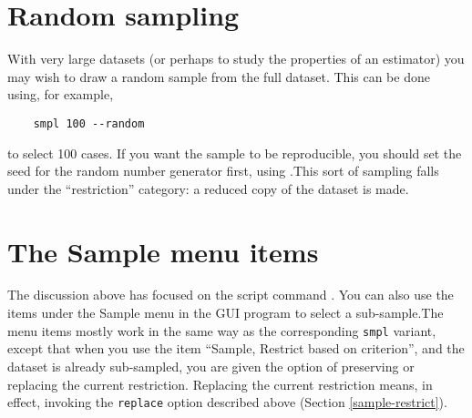 \section{Random sampling}
\label{sample-random}

With very large datasets (or perhaps to study the properties of an
estimator) you may wish to draw a random sample from the full dataset.
This can be done using, for example,
%
\begin{verbatim}
	smpl 100 --random
\end{verbatim}
%
to select 100 cases.  If you want the sample to be reproducible, you
should set the seed for the random number generator first, using
.This sort of sampling falls under the ``restriction''
category: a reduced copy of the dataset is made.

\section{The Sample menu items}
\label{sample-menu}

The discussion above has focused on the script command . You
can also use the items under the \textsf{Sample} menu in the GUI
program to select a sub-sample.The menu items mostly work in the same
way as the corresponding \verb+smpl+ variant, except that when you use
the item ``Sample, Restrict based on criterion'', and the dataset is
already sub-sampled, you are given the option of preserving or
replacing the current restriction.  Replacing the current restriction
means, in effect, invoking the \verb+replace+ option described above
(Section \ref{sample-restrict}).
    

